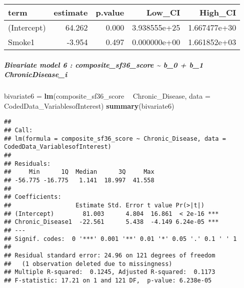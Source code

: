 \documentclass[]{article}
\newenvironment{Shaded}{\begin{snugshade}}{\end{snugshade}}
\newcommand{\DataTypeTok}[1]{\textcolor[rgb]{0.13,0.29,0.53}{#1}}
\newcommand{\DecValTok}[1]{\textcolor[rgb]{0.00,0.00,0.81}{#1}}
\newcommand{\FloatTok}[1]{\textcolor[rgb]{0.00,0.00,0.81}{#1}}
\newcommand{\KeywordTok}[1]{\textcolor[rgb]{0.13,0.29,0.53}{\textbf{#1}}}
\newcommand{\NormalTok}[1]{#1}
\newcommand{\OperatorTok}[1]{\textcolor[rgb]{0.81,0.36,0.00}{\textbf{#1}}}
\newcommand{\StringTok}[1]{\textcolor[rgb]{0.31,0.60,0.02}{#1}}
\let\oldsubparagraph\subparagraph
\renewcommand{\subparagraph}[1]{\oldsubparagraph{#1}\mbox{}}
\begin{document}
\begin{longtable}[]{@{}lrrrr@{}}
\toprule
term & estimate & p.value & Low\_CI & High\_CI\tabularnewline
\midrule
\endhead
(Intercept) & 64.262 & 0.000 & 3.938555e+25 &
1.667477e+30\tabularnewline
Smoke1 & -3.954 & 0.497 & 0.000000e+00 & 1.661852e+03\tabularnewline
\bottomrule
\end{longtable}

\hypertarget{bivariate-model-6-composite_sf36_score-b_0-b_1-chronicdisease_i}{%
\subparagraph{Bivariate model 6 : composite\_sf36\_score
\textasciitilde{} b\_0 + b\_1
ChronicDisease\_i}\label{bivariate-model-6-composite_sf36_score-b_0-b_1-chronicdisease_i}}

\begin{Shaded}
\begin{Highlighting}[]
\NormalTok{bivariate6 =}\StringTok{ }\KeywordTok{lm}\NormalTok{(composite_sf36_score }\OperatorTok{~}\StringTok{ }\NormalTok{Chronic_Disease, }\DataTypeTok{data =}\NormalTok{ CodedData_VariablesofInterest)}
\KeywordTok{summary}\NormalTok{(bivariate6)}
\end{Highlighting}
\end{Shaded}

\begin{verbatim}
## 
## Call:
## lm(formula = composite_sf36_score ~ Chronic_Disease, data = CodedData_VariablesofInterest)
## 
## Residuals:
##     Min      1Q  Median      3Q     Max 
## -56.775 -16.775   1.141  18.997  41.558 
## 
## Coefficients:
##                  Estimate Std. Error t value Pr(>|t|)    
## (Intercept)        81.003      4.804  16.861  < 2e-16 ***
## Chronic_Disease1  -22.561      5.438  -4.149 6.24e-05 ***
## ---
## Signif. codes:  0 '***' 0.001 '**' 0.01 '*' 0.05 '.' 0.1 ' ' 1
## 
## Residual standard error: 24.96 on 121 degrees of freedom
##   (1 observation deleted due to missingness)
## Multiple R-squared:  0.1245, Adjusted R-squared:  0.1173 
## F-statistic: 17.21 on 1 and 121 DF,  p-value: 6.238e-05
\end{verbatim}

\begin{Shaded}
\end{Shaded}
\end{document}
